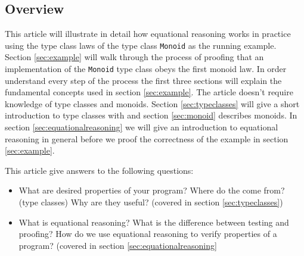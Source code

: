 \subsection{Overview}

This article will illustrate in detail how equational reasoning works in practice using the type class laws of the type class \verb|Monoid| as the running example. Section \ref{sec:example} will walk through the process of proofing that an implementation of the \verb|Monoid| type class obeys the first monoid law.  In order understand every step of the process the first three sections will explain the fundamental concepts used in section \ref{sec:example}. The article doesn't require knowledge of type classes and \glspl{monoid}. 
Section \ref{sec:typeclasses} will give a short introduction to type classes with and section \ref{sec:monoid} describes monoids. In section \ref{sec:equationalreasoning} we will give an introduction to equational reasoning in general before we proof the correctness of the example in section \ref{sec:example}.

This article give answers to the following questions:
\begin{itemize}
\item What are desired properties of your program? Where do the come from? (type classes) Why are they useful? (covered in section \ref{sec:typeclasses})
\item What is equational reasoning? What is the difference between testing and proofing? How do we use equational reasoning to verify properties of a program? (covered in section \ref{sec:equationalreasoning}
\end{itemize}

